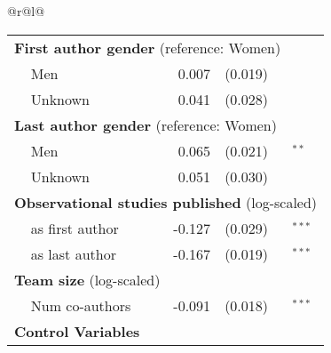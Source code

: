 \begin{tabular}{@{}r@{}l@{}}
\begin{tabular}[t]{@{}ll@{ }r@{ }l@{}l@{}}

\multicolumn{5}{l}{\textbf{First author gender} (reference: Women)} \\
&  Men & 0.007 & (0.019) & $^{}$ \\
&  Unknown &  0.041 & (0.028) & $^{}$ \\[.07in]

\multicolumn{5}{l}{\textbf{Last author gender} (reference: Women)} \\
&  Men & 0.065 & (0.021) & $^{**}$ \\
&  Unknown &  0.051 & (0.030) & $^{}$ \\[.07in]

\multicolumn{5}{l}{\textbf{Observational studies published} (log-scaled)} \\
& as first author & -0.127 & (0.029) & $^{***}$ \\
& as last author &   -0.167 & (0.019) & $^{***}$ \\[.07in]

\multicolumn{5}{l}{\textbf{Team size} (log-scaled)} \\
& Num co-authors & -0.091 & (0.018) & $^{***}$ \\ [.07in]



\midrule 
\multicolumn{5}{l}{\textbf{Control Variables}} \\ [.07in]

\iffalse
\multicolumn{5}{l}{\textbf{Observational studies published} (log-scaled)} \\
& as first author & -0.127 & (0.029) & $^{***}$ \\
& as last author &   -0.167 & (0.019) & $^{***}$ \\[.07in]

\multicolumn{5}{l}{\textbf{Team size} (log-scaled)} \\
& Num co-authors & -0.091 & (0.018) & $^{***}$ \\ [.07in]
\fi


\end{tabular}
\end{tabular}
